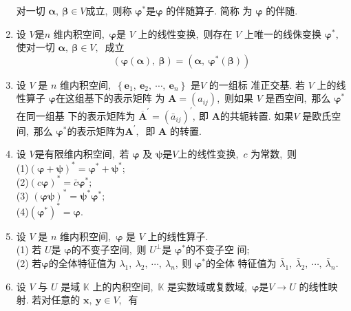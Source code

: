 \begin{enumerate}
		对一切  $\boldsymbol{\alpha},\  \boldsymbol{\beta} \in V  $成立,\  则称 $ \boldsymbol{\varphi}^{*}  $是$ \boldsymbol{\varphi}$ 的伴随算子. 简称 为 $ \boldsymbol{\varphi} $ 的伴随.
		\item 设 $ V  $是$  n$  维内积空间,\   $\boldsymbol{\varphi} $是 $ V$  上的线性变换,\  则存在  $V$  上唯一的线侏变换 $ \boldsymbol{\varphi}^{*} ,\ $ 使对一切 $\boldsymbol{\alpha},\  \boldsymbol{\beta} \in V ,\ $ 成立
		$$(\boldsymbol{\varphi}(\boldsymbol{\alpha}),\  \boldsymbol{\beta})=\left(\boldsymbol{\alpha},\  \boldsymbol{\varphi}^{*}(\boldsymbol{\beta})\right)$$
		\item 设  $V$  是 $ n $ 维内积空间,\  $ \left\{\boldsymbol{e}_{1},\  \boldsymbol{e}_{2},\  \cdots,\  \boldsymbol{e}_{n}\right\}$  是$  V$  的一组标 准正交基. 若 $ V$  上的线性算子  $\boldsymbol{\varphi}  $在这组基下的表示矩阵 为 $ \boldsymbol{A}=\left(a_{i j}\right) $,\  则如果  $V $ 是酉空间,\  那么 $ \boldsymbol{\varphi}^{*}  $在同一组基 下的表示矩阵为  $\overline{\boldsymbol{A}}^{\prime}=\left(\bar{a}_{i j}\right)^{\prime} ,\  $即  $\boldsymbol{A}  $的共轭转置. 如果$  V$  是欧氏空间,\  那么 $ \boldsymbol{\varphi}^{*}  $的表示矩阵为$  \boldsymbol{A}^{\prime} ,\ $ 即  $\boldsymbol{A} $ 的转置.
		\item 设 $ V  $是有限维内积空间,\  若 $ \boldsymbol{\varphi} $ 及 $ \boldsymbol{\psi}  $是$  V  $上的线性变换,\ $  c $ 为常数,\  则\\
		(1)$\left(\boldsymbol{\varphi}+\boldsymbol{\psi}\right)^{*}=\boldsymbol{\varphi}^{*}+\boldsymbol{\psi}^{*} ;$\\
		(2)$\left(c \boldsymbol{\varphi}\right)^{*}=\bar{c} \boldsymbol{\varphi}^{*} ;$\\
		(3) $\left(\boldsymbol{\varphi}\boldsymbol{\psi}\right)^{*}=\boldsymbol{\psi}^{*} \boldsymbol{\varphi}^{*} ;$\\
		(4)$  \left(\boldsymbol{\varphi}^{*}\right)^{*}=\boldsymbol{\varphi} .$
		\item 设  $V $ 是 $ n $ 维内积空间,\   $\boldsymbol{\varphi}$ 是  $V $ 上的线性算子.\\
		(1) 若  $U  $是 $\boldsymbol{\varphi}  $的不变子空间,\  则  $U^{\perp}  $是 $\boldsymbol{\varphi}^{*} $的不变子空 间;\\
		(2) 若$  \boldsymbol{\varphi} $的全体特征值为  $\lambda_{1},\  \lambda_{2},\  \cdots,\  \lambda_{n} ,\  $则  $\boldsymbol{\varphi}^{*}  $的全体 特征值为 $ \bar{\lambda}_{1},\  \bar{\lambda}_{2},\  \cdots,\  \bar{\lambda}_{n} .$
		\item 设  $V$  与 $ U$  是域 $ \mathbb{K} $ 上的内积空间,\   $\mathbb{K} $ 是实数域或复数域,\   $\boldsymbol{\varphi} $是$  V \rightarrow U$  的线性映射. 若对任意的 $ \boldsymbol{x},\  \boldsymbol{y} \in V ,\ $ 有

\end{enumerate}
